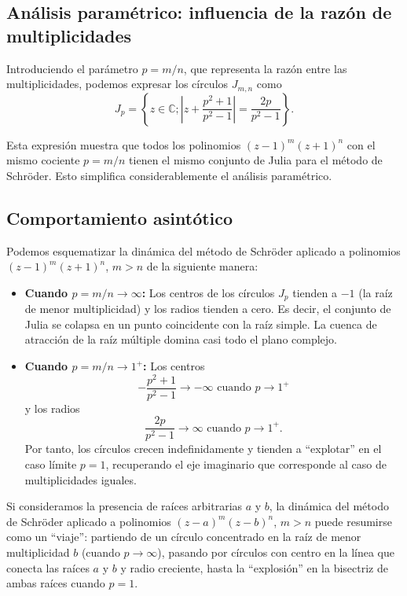 \subsection{Análisis paramétrico: influencia de la razón de multiplicidades}

Introduciendo el parámetro $p=m/n$, que representa la razón entre las multiplicidades, podemos expresar los círculos $J_{m,n}$ como
\begin{equation}
J_{p}=\left\{z\in\mathbb{C}; \left|z+\frac{p^2+1}{p^2-1}\right|=\frac{2p}{p^2-1}\right\}.
\label{eq:Julia_param}
\end{equation}

Esta expresión muestra que todos los polinomios $(z-1)^m(z+1)^n$ con el mismo cociente $p=m/n$ tienen el mismo conjunto de Julia para el método de Schröder. Esto simplifica considerablemente el análisis paramétrico.

\subsection{Comportamiento asintótico}

Podemos esquematizar la dinámica del método de Schröder aplicado a polinomios $(z-1)^m(z+1)^n$, $m>n$ de la siguiente manera:

\begin{itemize}
\item \textbf{Cuando $p=m/n\to \infty$:} Los centros de los círculos $J_p$ tienden a $-1$ (la raíz de menor multiplicidad) y los radios tienden a cero. Es decir, el conjunto de Julia se colapsa en un punto coincidente con la raíz simple. La cuenca de atracción de la raíz múltiple domina casi todo el plano complejo.

\item \textbf{Cuando $p=m/n\to 1^+$:} Los centros
$$
-\frac{p^2+1}{p^2-1}\to -\infty \text{ cuando } p\to 1^+
$$
y los radios
$$
\frac{2p}{p^2-1}\to \infty \text{ cuando } p\to 1^+.
$$
Por tanto, los círculos crecen indefinidamente y tienden a ``explotar'' en el caso límite $p=1$, recuperando el eje imaginario que corresponde al caso de multiplicidades iguales.
\end{itemize}

Si consideramos la presencia de raíces arbitrarias $a$ y $b$, la dinámica del método de Schröder aplicado a polinomios $(z-a)^m(z-b)^n$, $m>n$ puede resumirse como un ``viaje'': partiendo de un círculo concentrado en la raíz de menor multiplicidad $b$ (cuando $p\to\infty$), pasando por círculos con centro en la línea que conecta las raíces $a$ y $b$ y radio creciente, hasta la ``explosión'' en la bisectriz de ambas raíces cuando $p=1$.

